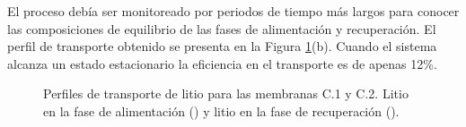 El proceso debía ser monitoreado por periodos de tiempo más largos para conocer las composiciones de equilibrio de las fases de alimentación y recuperación. El perfil de transporte obtenido se presenta en la Figura \ref{fig:profileC1}(b). Cuando el sistema alcanza un estado estacionario la eficiencia en el transporte es de apenas 12\%.

\begin{figure}[H]
    \centering
    \caption[Primeros perfiles de transporte de litio en celda de permeación.]{Perfiles de transporte de litio para las membranas C.1 y C.2. Litio en la fase de alimentación (\protect\squareblck) y litio en la fase de recuperación (\protect\squarewht).}        
    \label{fig:profileC1}
\end{figure}

